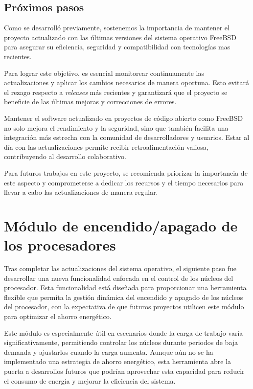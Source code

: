 \subsection{Próximos pasos}

Como se desarrolló previamente, sostenemos la importancia de mantener el proyecto actualizado con las últimas versiones del sistema operativo FreeBSD para asegurar su eficiencia, seguridad y compatibilidad con tecnologías mas recientes.\par

Para lograr este objetivo, es esencial monitorear continuamente las actualizaciones y aplicar los cambios necesarios de manera oportuna. Esto evitará el rezago respecto a \textit{releases} más recientes y garantizará que el proyecto se beneficie de las últimas mejoras y correcciones de errores.\par

Mantener el software actualizado en proyectos de código abierto como FreeBSD no solo mejora el rendimiento y la seguridad, sino que también facilita una integración más estrecha con la comunidad de desarrolladores y usuarios. Estar al día con las actualizaciones permite recibir retroalimentación valiosa, contribuyendo al desarrollo colaborativo.\par

Para futuros trabajos en este proyecto, se recomienda priorizar la importancia de este aspecto y comprometerse a dedicar los recursos y el tiempo necesarios para llevar a cabo las actualizaciones de manera regular.\par

\section{Módulo de encendido/apagado de los procesadores}

Tras completar las actualizaciones del sistema operativo, el siguiente paso fue desarrollar una nueva funcionalidad enfocada en el control de los núcleos del procesador. Esta funcionalidad está diseñada para proporcionar una herramienta flexible que permita la gestión dinámica del encendido y apagado de los núcleos del procesador, con la expectativa de que futuros proyectos utilicen este módulo para optimizar el ahorro energético.\par

Este módulo es especialmente útil en escenarios donde la carga de trabajo varía significativamente, permitiendo controlar los núcleos durante periodos de baja demanda y ajustarlos cuando la carga aumenta. Aunque aún no se ha implementado una estrategia de ahorro energético, esta herramienta abre la puerta a desarrollos futuros que podrían aprovechar esta capacidad para reducir el consumo de energía y mejorar la eficiencia del sistema.\par

